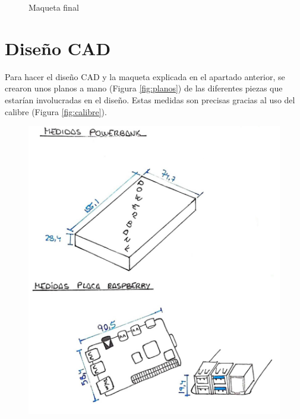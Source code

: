 \begin{figure}[ht!]
\begin{minipage}{0.4\linewidth}
		\caption*{\centering}
	\end{minipage}
	\caption{Maqueta final}
	\label{fig:maqueta2}
\end{figure}

\section{Diseño CAD}

Para hacer el diseño \acs{CAD} y la maqueta explicada en el apartado anterior, se crearon unos planos a mano (Figura \ref{fig:planos}) de las diferentes piezas que estarían involucradas en el diseño. Estas medidas son precisas gracias al uso del calibre (Figura \ref{fig:calibre}).


\begin{figure}[ht!]
	\centering
	\begin{minipage}{0.45\linewidth}
		\centering
		\includegraphics[width=\linewidth]{figs/cap5/planos1.jpeg}
		\caption*{\centering}
	\end{minipage}
	\hspace{1cm}
	\begin{minipage}{0.45\linewidth}
		\centering

\end{minipage}
\end{figure}
